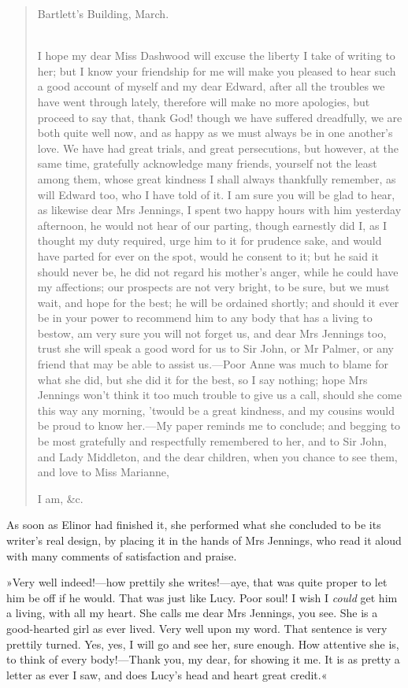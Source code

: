 \begin{quotation}
\begin{flushright}
Bartlett’s Building, March.
\end{flushright}
~\\
\indent I hope my dear Miss Dashwood will excuse the liberty I take of writing to her; but I know your friendship for me will make you pleased to hear such a good account of myself and my dear Edward, after all the troubles we have went through lately, therefore will make no more apologies, but proceed to say that, thank God! though we have suffered dreadfully, we are both quite well now, and as happy as we must always be in one another’s love. We have had great trials, and great persecutions, but however, at the same time, gratefully acknowledge many friends, yourself not the least among them, whose great kindness I shall always thankfully remember, as will Edward too, who I have told of it. I am sure you will be glad to hear, as likewise dear Mrs Jennings, I spent two happy hours with him yesterday afternoon, he would not hear of our parting, though earnestly did I, as I thought my duty required, urge him to it for prudence sake, and would have parted for ever on the spot, would he consent to it; but he said it should never be, he did not regard his mother’s anger, while he could have my affections; our prospects are not very bright, to be sure, but we must wait, and hope for the best; he will be ordained shortly; and should it ever be in your power to recommend him to any body that has a living to bestow, am very sure you will not forget us, and dear Mrs Jennings too, trust she will speak a good word for us to Sir John, or Mr Palmer, or any friend that may be able to assist us.—Poor Anne was much to blame for what she did, but she did it for the best, so I say nothing; hope Mrs Jennings won’t think it too much trouble to give us a call, should she come this way any morning, ’twould be a great kindness, and my cousins would be proud to know her.—My paper reminds me to conclude; and begging to be most gratefully and respectfully remembered to her, and to Sir John, and Lady Middleton, and the dear children, when you chance to see them, and love to Miss Marianne,
\begin{flushright}
I am, \&c.
\end{flushright}
\end{quotation}

As soon as Elinor had finished it, she performed what she concluded to be its writer’s real design, by placing it in the hands of Mrs Jennings, who read it aloud with many comments of satisfaction and praise.

»Very well indeed!—how prettily she writes!—aye, that was quite proper to let him be off if he would. That was just like Lucy. Poor soul! I wish I \textit{could} get him a living, with all my heart. She calls me dear Mrs Jennings, you see. She is a good-hearted girl as ever lived. Very well upon my word. That sentence is very prettily turned. Yes, yes, I will go and see her, sure enough. How attentive she is, to think of every body!—Thank you, my dear, for showing it me. It is as pretty a letter as ever I saw, and does Lucy’s head and heart great credit.«